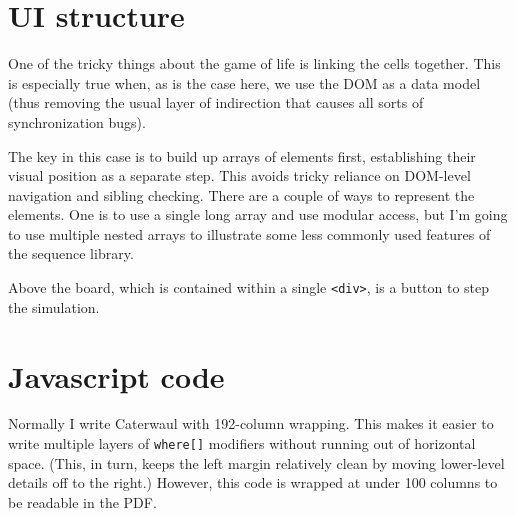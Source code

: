 \documentclass{report}
\begin{document}

\section{UI structure}
    One of the tricky things about the game of life is linking the cells together. This is especially true when, as is the case here, we use the DOM as a data model (thus removing the usual
    layer of indirection that causes all sorts of synchronization bugs).

    The key in this case is to build up arrays of elements first, establishing their visual position as a separate step. This avoids tricky reliance on DOM-level navigation and sibling
    checking. There are a couple of ways to represent the elements. One is to use a single long array and use modular access, but I'm going to use multiple nested arrays to illustrate some
    less commonly used features of the sequence library.

    Above the board, which is contained within a single \verb|<div>|, is a button to step the simulation.

\section{Javascript code}
    Normally I write Caterwaul with 192-column wrapping. This makes it easier to write multiple layers of {\tt where[]} modifiers without running out of horizontal space. (This, in turn, keeps
    the left margin relatively clean by moving lower-level details off to the right.) However, this code is wrapped at under 100 columns to be readable in the PDF.
\end{document}
